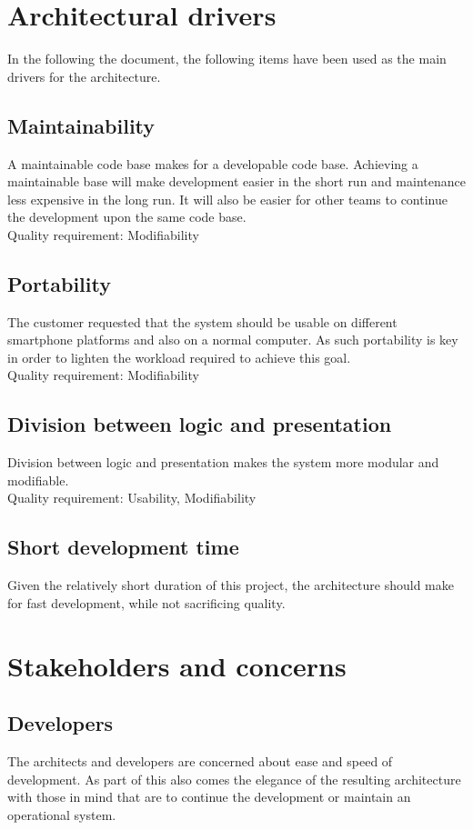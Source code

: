 \documentclass[11pt]{book}
\begin{document}
\section{Architectural drivers} \label{sec:architecture_drivers}
In the following the document, the following items have been used as the main drivers for the architecture.

\subsection{Maintainability} 
A maintainable code base makes for a developable code base. Achieving a maintainable base will make development easier in the short run and maintenance less expensive in the long run. It will also be easier for other teams to continue the development upon the same code base.\\
Quality requirement: Modifiability

\subsection{Portability}
The customer requested that the system should be usable on different smartphone platforms and also on a normal computer. As such portability is key in order to lighten the workload required to achieve this goal.\\
Quality requirement: Modifiability

\subsection{Division between logic and presentation}
Division between logic and presentation makes the system more modular and modifiable.\\
Quality requirement: Usability, Modifiability

\subsection{Short development time}
Given the relatively short duration of this project, the architecture should make for fast development, while not sacrificing quality.

\section{Stakeholders and concerns}

\subsection{Developers}
The architects and developers are concerned about ease and speed of development. As part of this also comes the elegance of the resulting architecture with those in mind that are to continue the development or maintain an operational system.
\end{document}
